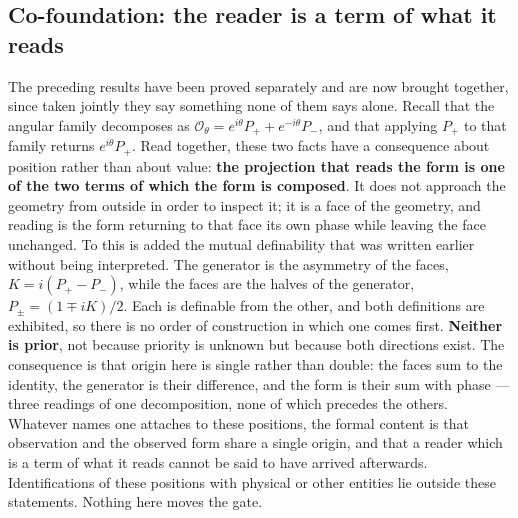 \documentclass[11pt]{article}
\theoremstyle{definition}\newtheorem{deriv}{Derivation}
\begin{document}
\subsection*{Co-foundation: the reader is a term of what it reads}The preceding results have been proved separately and are now brought together, since taken jointly they say something none of them says alone. Recall that the angular family decomposes as $\mathcal{O}_\theta = e^{i\theta}P_+ + e^{-i\theta}P_-$, and that applying $P_+$ to that family returns $e^{i\theta}P_+$. Read together, these two facts have a consequence about position rather than about value: \textbf{the projection that reads the form is one of the two terms of which the form is composed}. It does not approach the geometry from outside in order to inspect it; it is a face of the geometry, and reading is the form returning to that face its own phase while leaving the face unchanged. To this is added the mutual definability that was written earlier without being interpreted. The generator is the asymmetry of the faces, $K = i(P_+ - P_-)$, while the faces are the halves of the generator, $P_\pm = (1 \mp iK)/2$. Each is definable from the other, and both definitions are exhibited, so there is no order of construction in which one comes first. \textbf{Neither is prior}, not because priority is unknown but because both directions exist. The consequence is that origin here is single rather than double: the faces sum to the identity, the generator is their difference, and the form is their sum with phase --- three readings of one decomposition, none of which precedes the others. Whatever names one attaches to these positions, the formal content is that observation and the observed form share a single origin, and that a reader which is a term of what it reads cannot be said to have arrived afterwards. Identifications of these positions with physical or other entities lie outside these statements. Nothing here moves the gate.
\end{document}
